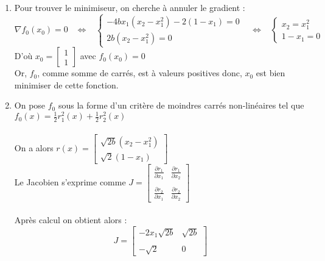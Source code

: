 \documentclass[12pt,a4paper,titlepage]{article}
\begin{document}
\begin{enumerate}
    \item{
            Pour trouver le minimiseur, on cherche à annuler le gradient :
            $$
            \nabla f_0(x_0)=0 \;\;\; \Leftrightarrow  \;\;\;
            \left\{
                \begin{array}{rl}
                    -4bx_1(x_2-x_1^2)-2(1-x_1)= 0 \\
                    2b(x_2-x_1^2) =0
                \end{array}
                \right. \;\;\; \Leftrightarrow \;\;\; \left\{
                \begin{array}{rl}
                    x_2 = x_1^2 \\
                    1-x_1 =0
                \end{array}
            \right.
            $$
            D'où $x_0= \left[ \begin{array}{c} 1 \\ 1  \end{array} \right]$ avec $f_0(x_0) = 0$ \\
            Or, $f_0$, comme somme de carrés, est à valeurs positives donc, $x_0$ est bien minimiser de cette fonction.
        }
    \item{
            On pose $f_0$ sous la forme d'un critère de moindres carrés non-linéaires tel que $f_0(x)=\frac{1}{2}r_1^2(x) + \frac{1}{2}r_2^2(x)$
            \\ \\
            On a alors $r(x) = \left[ \begin{array}{c} \sqrt{2b}(x_2-x_1^2) \\ \sqrt{2}(1-x_1) \end{array} \right]$
            \\Le Jacobien s'exprime comme $J=\left[ \begin{array}{cc} \frac{ \partial r_1}{\partial x_1} &  \frac{ \partial r_1}{\partial x_2} \\ \\ \frac{ \partial r_2}{\partial x_1} & \frac{ \partial r_2}{\partial x_2} \end{array} \right]$
            \\ \\ Après calcul on obtient alors :
            $$
            J=\left[
                \begin{array}{cc}
                    -2x_1\sqrt{2b} & \sqrt{2b} 
                    \\ \\
                    -\sqrt{2} & 0
            \end{array} \right]
            $$

        }
\end{enumerate}
\end{document}
